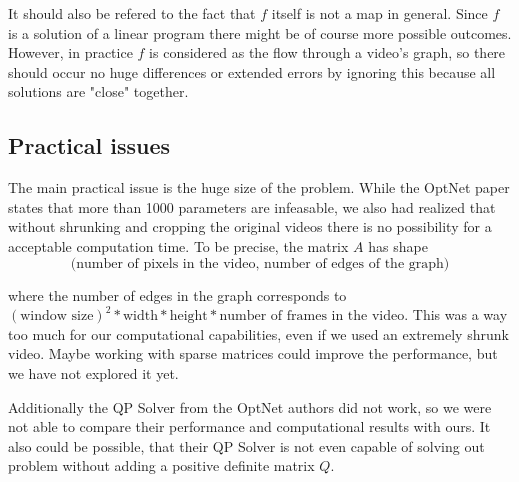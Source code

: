 \documentclass{article}
\begin{document}
It should also be refered to the fact that $f$ itself is not a map in general. Since $f$ is a solution of a linear program there might be of course more possible outcomes. However, in practice $f$ is considered as the flow through a video's graph, so there should occur no huge differences or extended errors by ignoring this because all solutions are "close" together. 



\subsection{Practical issues}

The main practical issue is the huge size of the problem. While the OptNet paper states that more than 1000 parameters are infeasable, we also had realized that without shrunking and cropping the original videos there is no possibility for a acceptable computation time. To be precise, the matrix $A$ has shape 
\[ \big(\text{number of pixels in the video, number of edges of the graph}\big)\]

where the number of edges in the graph corresponds to $(\text{window size})^2 * \text{width} * \text{height} * \text{number of frames in the video}$. This was a way too much for our computational capabilities, even if we used an extremely shrunk video. 
Maybe working with sparse matrices could improve the performance, but we have not explored it yet. 

Additionally the QP Solver from the OptNet authors did not work, so we were not able to compare their performance and computational results with ours. It also could be possible, that their QP Solver is not even capable of solving out problem without adding a positive definite matrix $Q$. 
\end{document}
